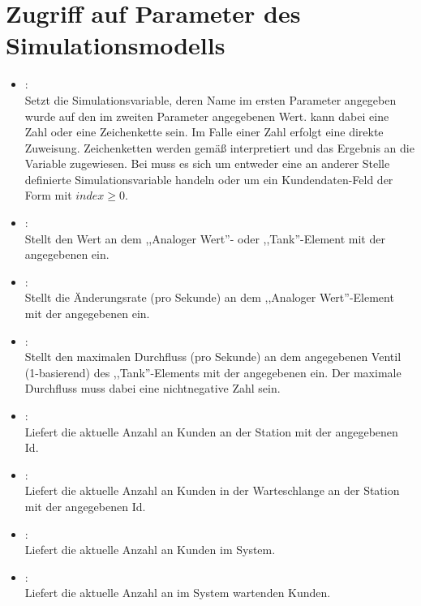 \section{Zugriff auf Parameter des Simulationsmodells}

\begin{itemize}

\item
{}:\\
Setzt die Simulationsvariable, deren Name im ersten Parameter angegeben wurde auf den im zweiten Parameter angegebenen Wert.
 kann dabei eine Zahl oder eine Zeichenkette sein. Im Falle einer Zahl erfolgt eine direkte Zuweisung.
Zeichenketten werden gemäß  interpretiert und das Ergebnis an die Variable zugewiesen. Bei 
muss es sich um entweder eine an anderer Stelle definierte Simulationsvariable handeln oder um ein Kundendaten-Feld der Form
 mit $index\ge0$.

\item
{}:\\
Stellt den Wert an dem ,,Analoger Wert''- oder ,,Tank''-Element mit der angegebenen  ein.
  
\item
{}:\\
Stellt die Änderungsrate (pro Sekunde) an dem ,,Analoger Wert''-Element mit der angegebenen  ein.
  
\item
{}:\\
Stellt den maximalen Durchfluss (pro Sekunde) an dem angegebenen Ventil (1-basierend) des ,,Tank''-Elements mit der angegebenen  ein.
Der maximale Durchfluss muss dabei eine nichtnegative Zahl sein. 

\item
{}:\\
Liefert die aktuelle Anzahl an Kunden an der Station mit der angegebenen Id.
  
\item
{}:\\
Liefert die aktuelle Anzahl an Kunden in der Warteschlange an der Station mit der angegebenen Id.

\item
{}:\\
Liefert die aktuelle Anzahl an Kunden im System.
  
\item
{}:\\
Liefert die aktuelle Anzahl an im System wartenden Kunden.

\end{itemize}

